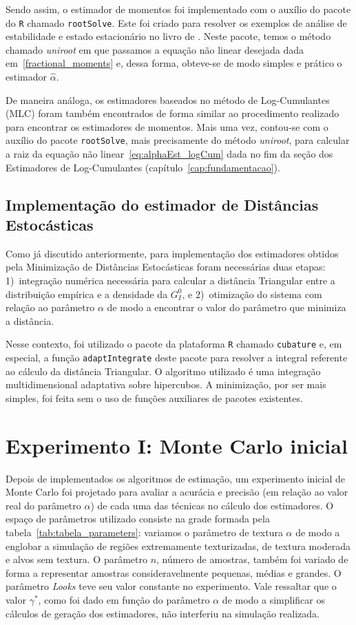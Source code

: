 Sendo assim, o estimador de momentos foi implementado com o auxílio do pacote do \texttt{R} chamado \texttt{rootSolve}. 
Este foi criado para resolver os exemplos de análise de estabilidade e estado estacionário no livro de \citet{Soetaert2009}. Neste pacote, temos o método chamado \textit{uniroot} em que passamos a equação não linear desejada dada em~\eqref{fractional_moments} e, dessa forma, obteve-se de modo simples e prático o estimador $\widehat{\alpha}$.

De maneira análoga, os estimadores baseados no método de Log-Cumulantes (MLC) foram também encontrados de forma similar ao procedimento realizado para encontrar os estimadores de momentos. 
Mais uma vez, contou-se com o auxílio do pacote \texttt{rootSolve}, mais precisamente do método \emph{uniroot}, para calcular a raiz da equação não linear~\eqref{eq:alphaEst_logCum} dada no fim da seção dos Estimadores de Log-Cumulantes (capítulo~\ref{cap:fundamentacao}).

\subsection{Implementação do estimador de Distâncias Estocásticas}

Como já discutido anteriormente, para implementação dos estimadores obtidos pela Minimização de Distâncias Estocásticas foram necessárias duas etapas: 
1)~integração numérica necessária para calcular a distância Triangular entre a distribuição empírica e a densidade da $G_I^0$, e 
2)~otimização do sistema com relação ao parâmetro $\alpha$ de modo a encontrar o valor do parâmetro que minimiza a distância.

Nesse contexto, foi utilizado o pacote da plataforma \texttt{R} chamado \texttt{cubature} e, em especial, a função \texttt{adaptIntegrate} deste pacote para resolver a integral referente ao cálculo da distância Triangular. O algoritmo utilizado é uma integração multidimensional adaptativa sobre hipercubos. 
A minimização, por ser mais simples, foi feita sem o uso de funções auxiliares de pacotes existentes.

\section{Experimento I: Monte Carlo inicial}

Depois de implementados os algoritmos de estimação, um experimento inicial de Monte Carlo foi projetado para avaliar a acurácia e precisão (em relação ao valor real do parâmetro $\alpha$) de cada uma das técnicas no cálculo dos estimadores. 
O espaço de parâmetros utilizado consiste na grade formada pela tabela~\ref{tab:tabela_parameters}: 
variamos o parâmetro de textura $\alpha$ de modo a englobar a simulação de regiões extremamente texturizadas, de textura moderada e alvos sem textura. 
O parâmetro $n$, número de amostras, também foi variado de forma a representar amostras consideravelmente pequenas, médias e grandes. 
O parâmetro \textit{Looks} teve seu valor constante no experimento. 
Vale ressaltar que o valor $\gamma^{*}$, como foi dado em função do parâmetro $\alpha$ de modo a simplificar os cálculos de geração dos estimadores, não interferiu na simulação realizada.

